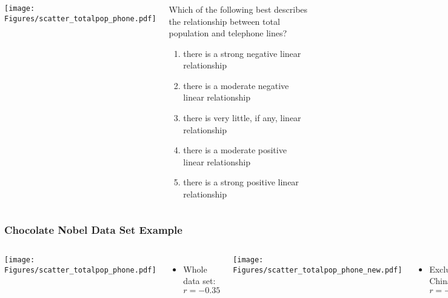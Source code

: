 \begin{frame}
\frametitle{\grp}
\begin{columns}
\texttt{[image: Figures/scatter\_totalpop\_phone.pdf]}\\
\begin{clicker}{Which of the following best describes the relationship between total population and telephone lines?}
\begin{enumerate}
    \item
    there is a strong negative linear relationship
    \item
    there is a moderate negative linear relationship
    \item
    there is very little, if any, linear relationship
    \item
    there is a moderate positive linear relationship
    \item
    there is a strong positive linear relationship
\end{enumerate}
\end{clicker}
\end{columns}
\end{frame}



\begin{frame}
\frametitle{Chocolate Nobel Data Set Example}
\begin{columns}
\texttt{[image: Figures/scatter\_totalpop\_phone.pdf]}\\
\begin{itemize}
    \item
    Whole data set: $r = -0.35$
\end{itemize}
\texttt{[image: Figures/scatter\_totalpop\_phone\_new.pdf]}\\
\begin{itemize}
    \item
    Excluding China: $r = -0.02$
\end{itemize}
\end{columns}
\end{frame}




